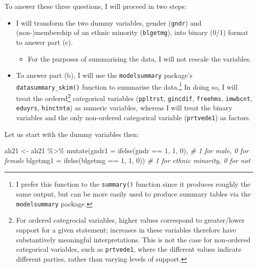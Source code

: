 \documentclass[
]{article}
\newenvironment{Shaded}{\begin{snugshade}}{\end{snugshade}}
\newcommand{\AttributeTok}[1]{\textcolor[rgb]{0.77,0.63,0.00}{#1}}
\newcommand{\CommentTok}[1]{\textcolor[rgb]{0.56,0.35,0.01}{\textit{#1}}}
\newcommand{\DecValTok}[1]{\textcolor[rgb]{0.00,0.00,0.81}{#1}}
\newcommand{\FunctionTok}[1]{\textcolor[rgb]{0.00,0.00,0.00}{#1}}
\newcommand{\NormalTok}[1]{#1}
\newcommand{\OtherTok}[1]{\textcolor[rgb]{0.56,0.35,0.01}{#1}}
\newcommand{\SpecialCharTok}[1]{\textcolor[rgb]{0.00,0.00,0.00}{#1}}
\providecommand{\tightlist}{%
  \setlength{\itemsep}{0pt}\setlength{\parskip}{0pt}}
\begin{document}
To answer these three questions, I will proceed in two steps:

\begin{itemize}
\item
  I will transform the two dummy variables, gender (\texttt{gndr}) and
  (non-)membership of an ethnic minority (\texttt{blgetmg}), into binary
  (0/1) format to answer part (c).

  \begin{itemize}
  \tightlist
  \item
    For the purposes of summarising the data, I will not rescale the
    variables.
  \end{itemize}
\item
  To answer part (b), I will use the \texttt{modelsummary} package's
  \texttt{datasummary\_skim()} function to summarise the
  data.\footnote{I prefer this function to the \texttt{summary()}
    function since it produces roughly the same output, but can be more
    easily used to produce summary tables via the \texttt{modelsummary}
    package.} In doing so, I will treat the ordered\footnote{For ordered
    categrocial variables, higher values correspond to greater/lower
    support for a given statement; increases in these variables
    therefore have substantively meaningful interpretations. This is not
    the case for non-ordered categorical variables, such as
    \texttt{prtvede1}, where the different values indicate different
    parties, rather than varying levels of support.} categorical
  variables (\texttt{ppltrst}, \texttt{gincdif}, \texttt{freehms},
  \texttt{imwbcnt}, \texttt{eduyrs}, \texttt{hinctnta}) as numeric
  variables, whereas I will treat the binary variables and the only
  non-ordered categorical variable (\texttt{prtvede1}) as factors.
\end{itemize}

Let us start with the dummy variables then:

\begin{Shaded}
\begin{Highlighting}[]
\NormalTok{ah21 }\OtherTok{\textless{}{-}}\NormalTok{ ah21 }\SpecialCharTok{\%\textgreater{}\%}
  \FunctionTok{mutate}\NormalTok{(}\AttributeTok{gndr1 =} \FunctionTok{ifelse}\NormalTok{(gndr }\SpecialCharTok{==} \DecValTok{1}\NormalTok{, }\DecValTok{1}\NormalTok{, }\DecValTok{0}\NormalTok{), }\CommentTok{\# 1 for male, 0 for female}
         \AttributeTok{blgetmg1 =} \FunctionTok{ifelse}\NormalTok{(blgetmg }\SpecialCharTok{==} \DecValTok{1}\NormalTok{, }\DecValTok{1}\NormalTok{, }\DecValTok{0}\NormalTok{)) }\CommentTok{\# 1 for ethnic minority, 0 for not }
\end{Highlighting}
\end{Shaded}
\end{document}
